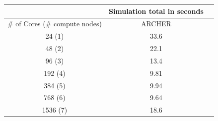 \begin{center}
\label{table:perf-archer}
\begin{tabular}{|c|c|c|}
\hline
\multicolumn{1}{|l|}{}            & \multicolumn{1}{c|}{Simulation total in seconds}               \\ \hline
\multicolumn{1}{|l|}{\# of Cores (\# compute nodes)} & \multicolumn{1}{c|}{ARCHER}  \\ \hline
24 (1)                                & 33.6                                           \\ \hline
48 (2)                                & 22.1                                         \\ \hline
96 (3)                               & 13.4                                       \\ \hline
192 (4)                              & 9.81                                           \\ \hline
384 (5)                               & 9.94                                               \\ \hline
768 (6)                              & 9.64                                              \\ \hline
1536 (7)                              & 18.6                                              \\ \hline
\end{tabular}
\end{center}


\vspace{0.5cm}

\noindent%
\begin{minipage}{\linewidth}%
 \label{fig:hemelb-perf-overview}%
\end{minipage}

